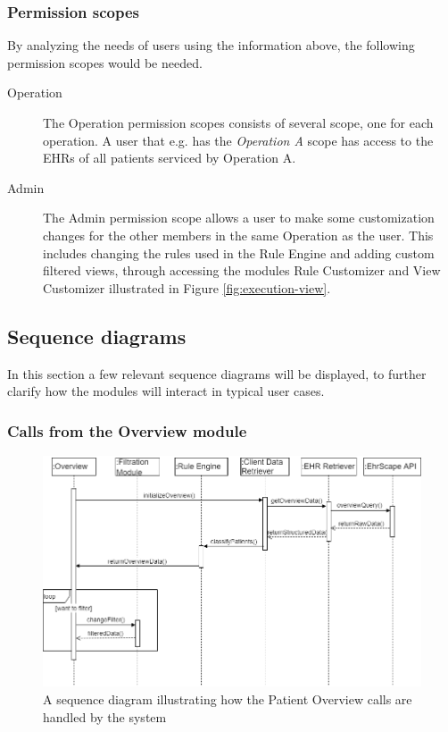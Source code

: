 \documentclass{article}
\begin{document}
\subsubsection{Permission scopes}
By analyzing the needs of users using the information above, the following permission scopes would be needed.

\begin{description}
\item [Operation] The Operation permission scopes consists of several scope, one for each operation. A user that e.g. has the \emph{Operation A} scope has access to the EHRs of all patients serviced by Operation A.
\item [Admin] The Admin permission scope allows a user to make some customization changes for the other members in the same Operation as the user. This includes changing the rules used in the Rule Engine and adding custom filtered views, through accessing the modules Rule Customizer and View Customizer illustrated in Figure \ref{fig:execution-view}.
\end{description}


\subsection{Sequence diagrams}
In this section a few relevant sequence diagrams will be displayed, to further clarify how the modules will interact in typical user cases.

\subsubsection{Calls from the Overview module}
\begin{figure}[h]
    \centering
    \includegraphics[scale = 0.45]{overview-sequence}
    \caption{A sequence diagram illustrating how the Patient Overview calls are handled by the system}
    \label{fig:overview-sequence}
\end{figure}
\end{document}
